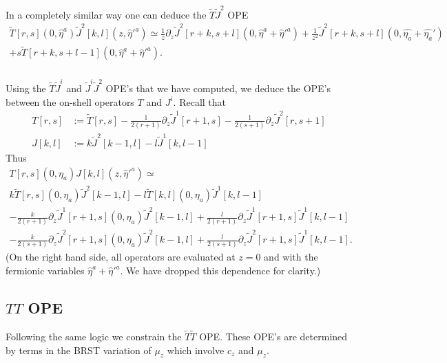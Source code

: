 \documentclass[11pt]{amsart}
\newcommand{\what}{\widehat}
\newcommand{\til}{\widetilde}
\theoremstyle{thm}
\numberwithin{equation}{subsection}
\theoremstyle{def}
\theoremstyle{rem}
\begin{document}
In a completely similar way one can deduce the $\til{T} \til{J}^2$ OPE
\begin{multline}
\til{T}[r,s](0,\what{\eta}^a) \til{J}^2[k,l] (z,\what{\eta}'^a) \simeq \frac1z \partial_z \til{J}^2[r+k,s+l](0,\what{\eta}^a + \what{\eta}'^a) + \frac{1}{z^2} \til{J}^2[r+k,s+l](0,\what{\eta_a} + \what{\eta_a}')  \\ + s \til{T}[r+k,s+l-1] (0,\what{\eta}^a + \what{\eta}'^a) .
\end{multline}

\subsubsection{}

Using the $\til{T} \til{J}^i$ and $\til{J}^i \til{J}^2$ OPE's that we have computed, we deduce the OPE's between the on-shell operators $T$ and $J^i$. 
Recall that
\begin{equation} 
	\begin{split}
		T[r,s] &:=  \til{T}[r,s] - \frac{1}{2(r+1)} \partial_z \til{J}^1[r+1,s] - \frac{1}{2(s+1)} \partial_z \til{J}^2[r,s+1] \\
		J[k,l] &:= k \til{J}^2[k-1,l] - l \til{J}^1[k,l-1] 
	\end{split}
\end{equation}
Thus
\begin{multline}
T[r,s](0, \eta_a) J[k,l](z,\what\eta'^a) \simeq \\ k \til{T}[r,s](0, \eta_a) \til{J}^2[k-1,l] - l \til{T}[k,l](0, \eta_a) \til{J}^1[k,l-1]  \\
- \frac{k}{2(r+1)} \partial_z \til{J}^1[r+1,s] (0,\eta_a) \til{J}^2[k-1,l] + \frac{l}{2(r+1)} \partial_z \til{J}^1[r+1,s] \til{J}^1[k,l-1] \\
- \frac{k}{2(s+1)} \partial_z \til{J}^2[r+1,s] (0,\eta_a) \til{J}^2[k-1,l] + \frac{l}{2(s+1)} \partial_z \til{J}^2[r+1,s] \til{J}^1[k,l-1] .
\end{multline}
(On the right hand side, all operators are evaluated at $z = 0$ and with the fermionic variables $\what{\eta}^a+\what{\eta}'^{a}$.  We have dropped this dependence for clarity.)

\subsection{$TT$ OPE}
\label{sec:TT1}

Following the same logic we constrain the $\til{T}\til{T}$ OPE. 
These OPE's are determined by terms in the BRST variation of $\mu_z$ which involve $c_z$ and $\mu_z$. 
\end{document}
